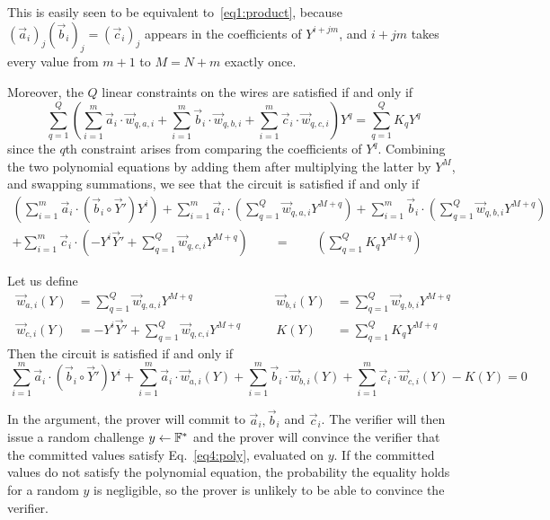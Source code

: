 This is easily seen to be equivalent to~\eqref{eq1:product}, because $(\vec{a}_{i})_j (\vec{b}_{i})_j = (\vec{c}_{i})_j$ appears in the coefficients of $Y^{i+jm}$, and $i+jm$ takes every value from $m+1$ to $M = N+m$ exactly once.
%

Moreover, the $Q$ linear constraints on the wires are satisfied if and only if $$\sum_{q=1}^Q \left(\sum_{i=1}^m \vec{a}_{i} \cdot \vec{w}_{q,{a,i}} +\sum_{i=1}^m \vec{b}_{i} \cdot  \vec{w}_{q,{b,i}} +\sum_{i=1}^m \vec{c}_{i}  \cdot \vec{w}_{q,{c,i}} \right)Y^q=\sum_{q=1}^Q K_{q}Y^q$$
since the $q$th constraint arises from comparing the coefficients of $Y^q$.
%
Combining the two polynomial equations by adding them after multiplying the latter by $Y^M$, and swapping summations, we see that the circuit is satisfied if and only if 
\begin{align*}\left( \sum_{i=1}^m  \vec{a}_i  \cdot ( \vec{b}_i \circ \vec{Y}') Y^i \right)+ \sum_{i=1}^m \vec{a}_{i}  \cdot \left( \sum_{q=1}^Q \vec{w}_{q,{a,i}}Y^{M+q}\right) +\sum_{i=1}^m \vec{b}_{i} \cdot  \left( \sum_{q=1}^Q \vec{w}_{q,{b,i}}Y^{M+q}\right)\\ +\sum_{i=1}^m \vec{c}_{i} \cdot  \left(- Y^i \vec{Y}' +  \sum_{q=1}^Q \vec{w}_{q,{c,i}}Y^{M+q}\right)
\qquad= \qquad\left(\sum_{q=1}^Q K_{q}Y^{M+q}\right)
\end{align*}

%
Let us define \begin{align*}
\vec{w}_{a,i}(Y)&=\sum_{q=1}^Q\vec{w}_{q,a,i}Y^{M+q} \qquad& \vec{w}_{b,i}(Y)&=\sum_{q=1}^Q\vec{w}_{q,b,i}Y^{M+q} \\
\vec{w}_{c,i}(Y)&=- Y^i \vec{Y}' +  \sum_{q=1}^Q \vec{w}_{q,c,i}Y^{M+q} \qquad& K(Y)&=\sum_{q=1}^Q K_q Y^{M+q}
\end{align*} 
Then the circuit is satisfied if and only if
%
%
\begin{equation}~\label{eq4:poly} 
\sum_{i=1}^m  \vec{a}_i  \cdot (\vec{b}_i \circ \vec{Y}') Y^i + \sum_{i=1}^m \vec{a}_i  \cdot \vec{w}_{a,i}(Y)  +\sum_{i=1}^m \vec{b}_i \cdot \vec{w}_{b,i}(Y)   +\sum_{i=1}^m \vec{c}_i \cdot \vec{w}_{c,i}(Y) - K(Y) = 0 
\end{equation}

In the argument, the prover will commit to $\vec{a}_{i},\vec{b}_{i}$ and $\vec{c}_{i}$. The verifier will then issue a random challenge $y\gets \mathbb{F}^*$ and the prover will convince the verifier that the committed values satisfy Eq.~\ref{eq4:poly}, evaluated on $y$. If the committed values do not satisfy the polynomial equation,  the probability the equality holds for a random $y$ is negligible, so the prover is unlikely to be able to convince the verifier.

